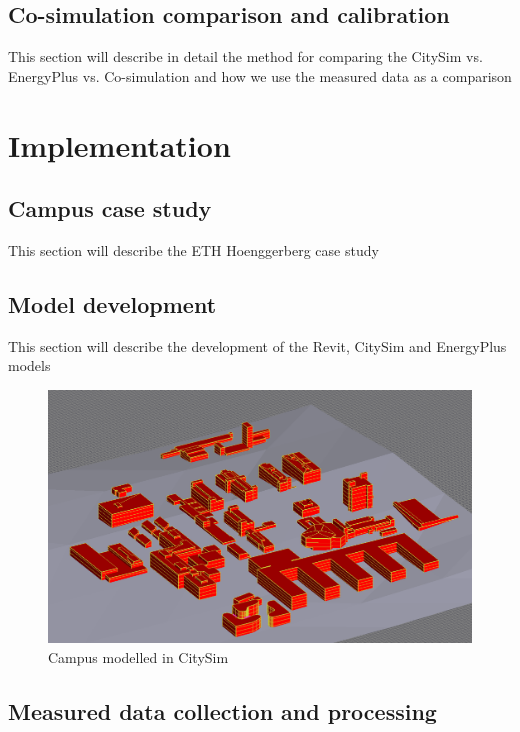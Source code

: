 \documentclass{tBPS2e}
\theoremstyle{plain}
\theoremstyle{definition}
\theoremstyle{remark}
\begin{document}
\subsection{Co-simulation comparison and calibration}

{\color{red}This section will describe in detail the method for comparing the CitySim vs. EnergyPlus vs. Co-simulation and how we use the measured data as a comparison}

\section{Implementation}
\subsection{Campus case study}
{\color{red}This section will describe the ETH Hoenggerberg case study}


\subsection{Model development}
{\color{red}This section will describe the development of the Revit, CitySim and EnergyPlus models}
\begin{figure}
\centering
\includegraphics[scale=0.3]{figures/campuscitysim}
\caption{Campus modelled in CitySim}
\label{fig:campuscitysim}
\end{figure}

\subsection{Measured data collection and processing}
\end{document}
